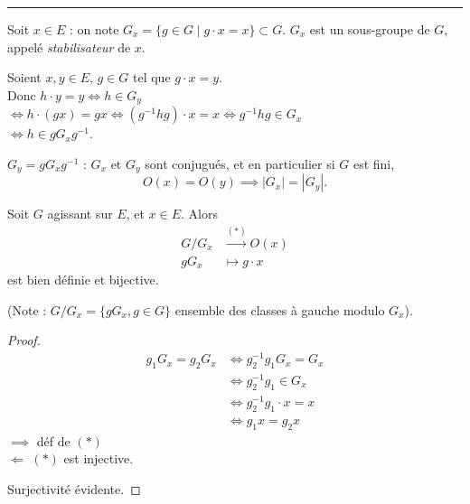 \vspace{0.3cm}

\noindent \rule{\textwidth}{0.5pt}

Soit $x \in E$ : on note $G_x = \{ g \in G \mid g \cdot x = x \} \subset G$. 
$G_x$ est un sous-groupe de $G$, appelé \textit{stabilisateur} de $x$.

Soient $x, y \in E$, $g \in G$ tel que $g \cdot x = y$. \\
Donc $h \cdot y = y \iff h \in G_y$ \\
\hspace*{2.2cm} $\iff h \cdot (gx) = gx \iff (g^{-1}hg) \cdot x = x \iff g^{-1}hg \in G_x$ \\
\hspace*{2.2cm} $\iff h \in g G_x g^{-1}$.


$G_y = g G_x g^{-1}$ : $G_x$ et $G_y$ sont conjugués, et en particulier si $G$ est fini,
\[
O(x) = O(y) \implies |G_x| = |G_y|.
\]

\vspace{0.5cm}

\begin{theoreme}{}{}  
    Soit $G$ agissant sur $E$, et $x \in E$. Alors
\[
\begin{aligned}
    G/G_x &\xrightarrow{(*)} O(x) \\
    gG_x &\longmapsto g \cdot x
\end{aligned}
\]
est bien définie et bijective.

\end{theoreme}
{\footnotesize (Note : $G/G_x = \{ gG_x, g \in G \}$ ensemble des classes à gauche modulo $G_x$).}

\vspace{0.3cm}

\begin{proof}
    
\begin{align*}
    g_1 G_x = g_2 G_x &\iff g_2^{-1} g_1 G_x = G_x \\
    &\iff g_2^{-1} g_1 \in G_x \\
    &\iff g_2^{-1} g_1 \cdot x = x \\
    &\iff g_1 x = g_2 x
\end{align*}
$\implies$ déf de $(*)$ \\
$\Longleftarrow$ $(*)$ est injective.

\noindent Surjectivité évidente.

\end{proof}

\vspace{0.5cm}

